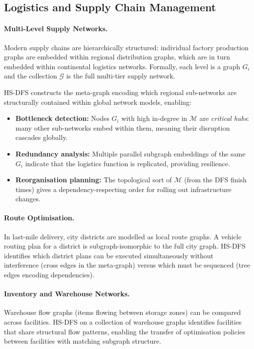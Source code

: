﻿\documentclass[12pt,a4paper]{article}
\theoremstyle{plain}
\theoremstyle{definition}
\theoremstyle{remark}
\begin{document}
	\subsection{Logistics and Supply Chain Management}
	\label{sec:logistics}
	
	\paragraph{Multi-Level Supply Networks.}
	Modern supply chains are hierarchically structured: individual factory
	production graphs are embedded within regional distribution graphs, which
	are in turn embedded within continental logistics networks.  Formally, each
	level is a graph $G_i$ and the collection $\mathcal{G}$ is the full
	multi-tier supply network.
	
	HS-DFS constructs the meta-graph encoding which regional sub-networks are
	structurally contained within global network models, enabling:
	
	\begin{itemize}
		\item \textbf{Bottleneck detection:} Nodes $G_i$ with high in-degree in
		$\mathcal{M}$ are \emph{critical hubs}: many other sub-networks embed
		within them, meaning their disruption cascades globally.
		\item \textbf{Redundancy analysis:} Multiple parallel subgraph embeddings
		of the same $G_i$ indicate that the logistics function is replicated,
		providing resilience.
		\item \textbf{Reorganisation planning:} The topological sort of $\mathcal{M}$
		(from the DFS finish times) gives a dependency-respecting order for
		rolling out infrastructure changes.
	\end{itemize}
	
	\paragraph{Route Optimisation.}
	In last-mile delivery, city districts are modelled as local route graphs.
	A vehicle routing plan for a district is subgraph-isomorphic to the full
	city graph.  HS-DFS identifies which district plans can be executed
	simultaneously without interference (cross edges in the meta-graph) versus
	which must be sequenced (tree edges encoding dependencies).
	
	\paragraph{Inventory and Warehouse Networks.}
	Warehouse flow graphs (items flowing between storage zones) can be compared
	across facilities.  HS-DFS on a collection of warehouse graphs identifies
	facilities that share structural flow patterns, enabling the transfer of
	optimisation policies between facilities with matching subgraph structure.
	
\end{document}
